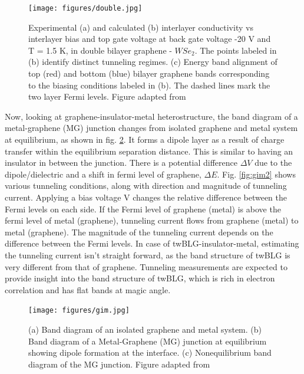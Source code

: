 \begin{figure}[H]
	\centering
	\texttt{[image: figures/double.jpg]}
	\caption{Experimental (a) and calculated (b) interlayer conductivity vs interlayer bias and top gate voltage at back gate voltage -20 V and T = 1.5 K, in double bilayer graphene - $WSe_2$. The points labeled in (b) identify distinct tunneling regimes. (c) Energy band alignment of top (red) and bottom (blue) bilayer graphene bands corresponding to the biasing conditions labeled in (b). The dashed lines mark the two layer Fermi levels. Figure adapted from \cite{Tutuc18}}
	\label{fig:double}
\end{figure}

Now, looking at graphene-insulator-metal heterostructure, \cite{chaves2013model} the band diagram of a metal-graphene (MG) junction changes from isolated graphene and metal system at equilibrium, as shown in fig. \ref{fig:gim}. It forms a dipole layer as a result of charge transfer within the equilibrium separation distance. This is similar to having an insulator in between the junction. There is a potential difference $\Delta V$ due to the dipole/dielectric and a shift in fermi level of graphene, $\Delta E$. Fig. \ref{fig:gim2} shows various tunneling conditions, along with direction and magnitude of tunneling current. Applying a bias voltage V changes the relative difference between the Fermi levels on each side. If the Fermi level of graphene (metal) is above the fermi level of metal (graphene), tunneling current flows from graphene (metal) to metal (graphene). The magnitude of the tunneling current depends on the difference between the Fermi levels. In case of twBLG-insulator-metal, estimating the tunneling current isn't straight forward, as the band structure of twBLG is very different from that of graphene. Tunneling measurements are expected to provide insight into the band structure of twBLG, which is rich in electron correlation and has flat bands at magic angle.

\begin{figure}[H]
	\centering
	\texttt{[image: figures/gim.jpg]}
	\caption{(a) Band diagram of an isolated graphene and metal system. (b) Band diagram of a Metal-Graphene (MG) junction at equilibrium showing dipole formation at the	interface. (c) Nonequilibrium band diagram of the MG junction. Figure adapted from \cite{chaves2013model}}
	\label{fig:gim}
\end{figure}

